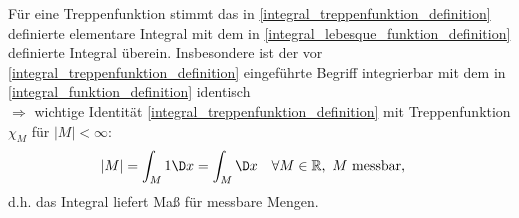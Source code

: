 \begin{conclusion}
	Für eine Treppenfunktion stimmt das in \eqref{integral_treppenfunktion_definition} definierte elementare Integral mit dem in \eqref{integral_lebesque_funktion_definition} definierte Integral überein. Insbesondere ist der vor \eqref{integral_treppenfunktion_definition} eingeführte Begriff integrierbar mit dem in \eqref{integral_funktion_definition} identisch\\
	$\Rightarrow$ wichtige Identität \eqref{integral_treppenfunktion_definition} mit Treppenfunktion $\chi_M$ für $\vert M \vert < \infty$: \begin{align*}
		\vert M \vert &= \int_M 1\D x = \int_M \D x\quad\forall M\in\mathbb{R},\text{ $M$ messbar},
	\end{align*}
	d.h. das Integral liefert Maß für messbare Mengen.
\end{conclusion}

